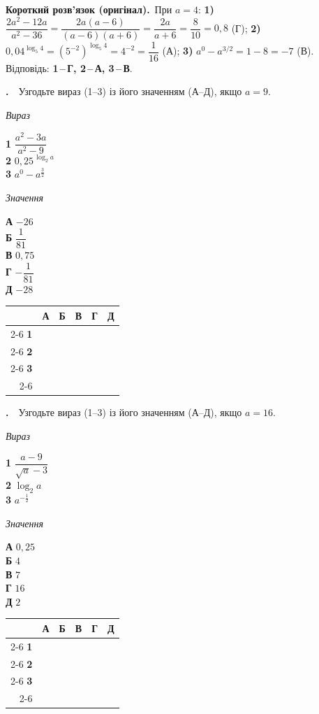 \documentclass[12pt]{article}
\newcommand{\matchingGrid}{%
    \begingroup
    \renewcommand{\arraystretch}{1.15}
    \setlength{\tabcolsep}{4pt}
    \footnotesize
    \begin{tabular}{r|c|c|c|c|c|}
         \multicolumn{1}{c}{} & \multicolumn{1}{c}{\textbf{А}} & \multicolumn{1}{c}{\textbf{Б}} & \multicolumn{1}{c}{\textbf{В}} & \multicolumn{1}{c}{\textbf{Г}} & \multicolumn{1}{c}{\textbf{Д}} \\ \cline{2-6}
         \textbf{1} & \phantom{X} & \phantom{X} & \phantom{X} & \phantom{X} & \phantom{X} \\ \cline{2-6}
         \textbf{2} & & & & & \\ \cline{2-6}
         \textbf{3} & & & & & \\ \cline{2-6}
    \end{tabular}
    \endgroup
}
\newcounter{zad}
\newcommand{\zadtask}[1]{\stepcounter{zad}\noindent\textbf{\thezad.}\ \ #1\par\vspace{0.2cm}}
\newcommand{\solution}[1]{%
\par\vspace{0.12cm}
\begin{tcolorbox}[colback=titleBg!45, colframe=mainGreen!55, boxrule=0.4pt, arc=2pt,
    left=6pt, right=6pt, top=3pt, bottom=3pt, breakable]
\footnotesize\textbf{Короткий розв'язок (оригінал).}\ #1
\end{tcolorbox}
\par\vspace{0.12cm}
}
\begin{document}
\solution{При $a=4$: \textbf{1)} $\dfrac{2a^2-12a}{a^2-36}=\dfrac{2a(a-6)}{(a-6)(a+6)}=\dfrac{2a}{a+6}=\dfrac{8}{10}=0{,}8$ (Г); \textbf{2)} $0{,}04^{\log_5 4}=(5^{-2})^{\log_5 4}=4^{-2}=\dfrac{1}{16}$ (А); \textbf{3)} $a^0-a^{3/2}=1-8=-7$ (В). Відповідь: \textbf{1\,--\,Г, 2\,--\,А, 3\,--\,В}.}
\zadtask{Узгодьте вираз (1--3) із його значенням (А--Д), якщо $a = 9$.

\vspace{0.3cm}
\noindent
\begin{minipage}[t]{0.45\textwidth}
\textit{Вираз}\par\vspace{0.2cm}
\textbf{1} \quad $\dfrac{a^2 - 3a}{a^2 - 9}$\\[0.5cm]
\textbf{2} \quad $0{,}25^{\,\log_2 a}$\\[0.45cm]
\textbf{3} \quad $a^0 - a^{\frac{3}{2}}$
\end{minipage}
\hfill
\begin{minipage}[t]{0.3\textwidth}
\textit{Значення}\par\vspace{0.2cm}
\textbf{А} \quad $-26$\\[0.25cm]
\textbf{Б} \quad $\dfrac{1}{81}$\\[0.2cm]
\textbf{В} \quad $0{,}75$\\[0.2cm]
\textbf{Г} \quad $-\dfrac{1}{81}$\\[0.2cm]
\textbf{Д} \quad $-28$
\end{minipage}
\hfill
\begin{minipage}[t]{0.2\textwidth}
\vspace{0.5cm}
\begin{flushright}\matchingGrid\end{flushright}
\end{minipage}
}
\zadtask{Узгодьте вираз (1--3) із його значенням (А--Д), якщо $a = 16$.

\vspace{0.3cm}
\noindent
\begin{minipage}[t]{0.45\textwidth}
\textit{Вираз}\par\vspace{0.2cm}
\textbf{1} \quad $\dfrac{a - 9}{\sqrt{a} - 3}$\\[0.5cm]
\textbf{2} \quad $\log_2 a$\\[0.45cm]
\textbf{3} \quad $a^{-\frac{1}{2}}$
\end{minipage}
\hfill
\begin{minipage}[t]{0.3\textwidth}
\textit{Значення}\par\vspace{0.2cm}
\textbf{А} \quad $0{,}25$\\[0.25cm]
\textbf{Б} \quad $4$\\[0.2cm]
\textbf{В} \quad $7$\\[0.2cm]
\textbf{Г} \quad $16$\\[0.2cm]
\textbf{Д} \quad $2$
\end{minipage}
\hfill
\begin{minipage}[t]{0.2\textwidth}
\vspace{0.5cm}
\begin{flushright}\matchingGrid\end{flushright}
\end{minipage}
}
\end{document}
